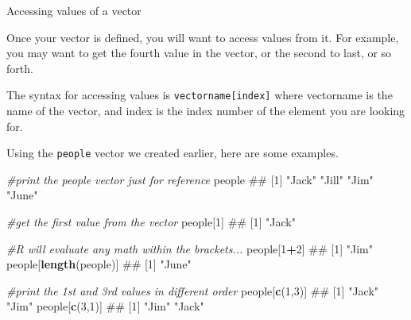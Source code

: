 \documentclass[ignorenonframetext,]{beamer}
\newenvironment{Shaded}{\begin{snugshade}}{\end{snugshade}}
\newcommand{\KeywordTok}[1]{\textcolor[rgb]{0.13,0.29,0.53}{\textbf{#1}}}
\newcommand{\DecValTok}[1]{\textcolor[rgb]{0.00,0.00,0.81}{#1}}
\newcommand{\CommentTok}[1]{\textcolor[rgb]{0.56,0.35,0.01}{\textit{#1}}}
\newcommand{\OperatorTok}[1]{\textcolor[rgb]{0.81,0.36,0.00}{\textbf{#1}}}
\newcommand{\NormalTok}[1]{#1}
\begin{document}
\begin{frame}[fragile]{Accessing values of a vector}

Once your vector is defined, you will want to access values from it. For
example, you may want to get the fourth value in the vector, or the
second to last, or so forth.

The syntax for accessing values is \texttt{vectorname{[}index{]}} where
vectorname is the name of the vector, and index is the index number of
the element you are looking for.

Using the \texttt{people} vector we created earlier, here are some
examples.

\end{frame}

\begin{frame}[fragile]

\begin{Shaded}
\begin{Highlighting}[]
\CommentTok{#print the people vector just for reference}
\NormalTok{people}
\NormalTok{## [1] "Jack" "Jill" "Jim"  "June"}
\end{Highlighting}
\end{Shaded}

\begin{Shaded}
\begin{Highlighting}[]
\CommentTok{#get the first value from the vector}
\NormalTok{people[}\DecValTok{1}\NormalTok{]}
\NormalTok{## [1] "Jack"}
\end{Highlighting}
\end{Shaded}

\begin{Shaded}
\begin{Highlighting}[]
\CommentTok{#R will evaluate any math within the brackets...}
\NormalTok{people[}\DecValTok{1}\OperatorTok{+}\DecValTok{2}\NormalTok{]}
\NormalTok{## [1] "Jim"}
\NormalTok{people[}\KeywordTok{length}\NormalTok{(people)]}
\NormalTok{## [1] "June"}
\end{Highlighting}
\end{Shaded}

\begin{Shaded}
\begin{Highlighting}[]
\CommentTok{#print the 1st and 3rd values in different order}
\NormalTok{people[}\KeywordTok{c}\NormalTok{(}\DecValTok{1}\NormalTok{,}\DecValTok{3}\NormalTok{)]}
\NormalTok{## [1] "Jack" "Jim"}
\NormalTok{people[}\KeywordTok{c}\NormalTok{(}\DecValTok{3}\NormalTok{,}\DecValTok{1}\NormalTok{)]}
\NormalTok{## [1] "Jim"  "Jack"}
\end{Highlighting}
\end{Shaded}

\end{frame}
\end{document}
